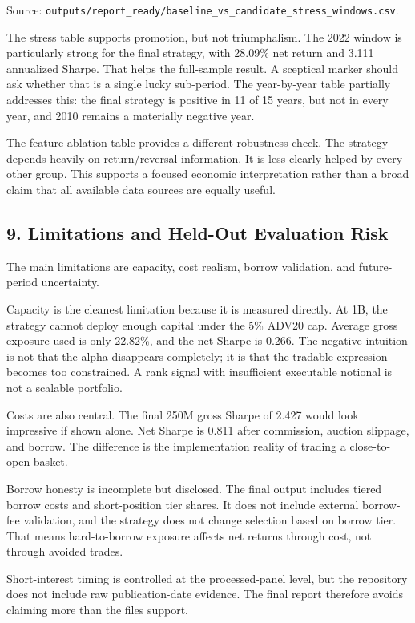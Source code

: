 \documentclass[
]{article}
\begin{document}
Source:
\texttt{outputs/report\_ready/baseline\_vs\_candidate\_stress\_windows.csv}.

The stress table supports promotion, but not triumphalism. The 2022
window is particularly strong for the final strategy, with 28.09\% net
return and 3.111 annualized Sharpe. That helps the full-sample result. A
sceptical marker should ask whether that is a single lucky sub-period.
The year-by-year table partially addresses this: the final strategy is
positive in 11 of 15 years, but not in every year, and 2010 remains a
materially negative year.

The feature ablation table provides a different robustness check. The
strategy depends heavily on return/reversal information. It is less
clearly helped by every other group. This supports a focused economic
interpretation rather than a broad claim that all available data sources
are equally useful.

\hypertarget{9-limitations-and-held-out-evaluation-risk}{%
\subsection{9. Limitations and Held-Out Evaluation
Risk}\label{9-limitations-and-held-out-evaluation-risk}}

The main limitations are capacity, cost realism, borrow validation, and
future-period uncertainty.

Capacity is the cleanest limitation because it is measured directly. At
1B, the strategy cannot deploy enough capital under the 5\% ADV20 cap.
Average gross exposure used is only 22.82\%, and the net Sharpe is
0.266. The negative intuition is not that the alpha disappears
completely; it is that the tradable expression becomes too constrained.
A rank signal with insufficient executable notional is not a scalable
portfolio.

Costs are also central. The final 250M gross Sharpe of 2.427 would look
impressive if shown alone. Net Sharpe is 0.811 after commission, auction
slippage, and borrow. The difference is the implementation reality of
trading a close-to-open basket.

Borrow honesty is incomplete but disclosed. The final output includes
tiered borrow costs and short-position tier shares. It does not include
external borrow-fee validation, and the strategy does not change
selection based on borrow tier. That means hard-to-borrow exposure
affects net returns through cost, not through avoided trades.

Short-interest timing is controlled at the processed-panel level, but
the repository does not include raw publication-date evidence. The final
report therefore avoids claiming more than the files support.
\end{document}
